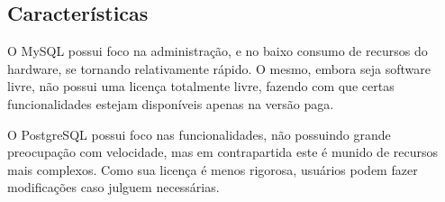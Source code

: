 \documentclass[12pt]{article}
\begin{document}
    \subsection{Características}
         O MySQL possui foco na administração, e no baixo consumo de recursos do hardware, se tornando relativamente rápido. O mesmo, embora seja software livre, não possui uma licença totalmente livre, fazendo com que certas funcionalidades estejam disponíveis apenas na versão paga.
         
         O PostgreSQL possui foco nas funcionalidades, não possuindo grande preocupação com velocidade, mas em contrapartida este é munido de recursos mais complexos. Como sua licença é menos rigorosa, usuários podem fazer modificações caso julguem necessárias.  

\nocite{ex1}


\end{document}
